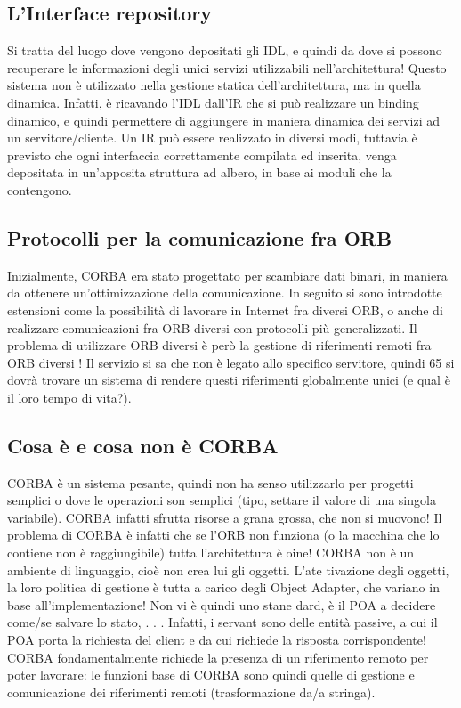 \subsection{L'Interface repository}
Si tratta del luogo dove vengono depositati gli IDL, e quindi da dove si possono
recuperare le informazioni degli unici servizi utilizzabili nell'architettura!
Questo sistema non è utilizzato nella gestione statica dell'architettura, ma
in quella dinamica. Infatti, è ricavando l'IDL dall'IR che si può realizzare un
binding dinamico, e quindi permettere di aggiungere in maniera dinamica dei
servizi ad un servitore/cliente.
Un IR può essere realizzato in diversi modi, tuttavia è previsto che ogni
interfaccia correttamente compilata ed inserita, venga depositata in un'apposita
struttura ad albero, in base ai moduli che la contengono.
\subsection{Protocolli per la comunicazione fra ORB}
Inizialmente, CORBA era stato progettato per scambiare dati binari, in maniera
da ottenere un'ottimizzazione della comunicazione. In seguito si sono introdotte
estensioni come la possibilità di lavorare in Internet fra diversi ORB, o anche di
realizzare comunicazioni fra ORB diversi con protocolli più generalizzati.
Il problema di utilizzare ORB diversi è però la gestione di riferimenti remoti
fra ORB diversi ! Il servizio si sa che non è legato allo specifico servitore, quindi
65
si dovrà trovare un sistema di rendere questi riferimenti globalmente unici (e
qual è il loro tempo di vita?).
\subsection{Cosa è e cosa non è CORBA}
CORBA è un sistema pesante, quindi non ha senso utilizzarlo per progetti
semplici o dove le operazioni son semplici (tipo, settare il valore di una singola
variabile). CORBA infatti sfrutta risorse a grana grossa, che non si muovono!
Il problema di CORBA è infatti che se l'ORB non funziona (o la macchina che
lo contiene non è raggiungibile) tutta l'architettura è oine!
CORBA non è un ambiente di linguaggio, cioè non crea lui gli oggetti. L'ate
tivazione degli oggetti, la loro politica di gestione è tutta a carico degli Object
Adapter, che variano in base all'implementazione! Non vi è quindi uno stane
dard, è il POA a decidere come/se salvare lo stato, . . . Infatti, i servant sono
delle entità passive, a cui il POA porta la richiesta del client e da cui richiede
la risposta corrispondente!
CORBA fondamentalmente richiede la presenza di un riferimento remoto
per poter lavorare: le funzioni base di CORBA sono quindi quelle di gestione e
comunicazione dei riferimenti remoti (trasformazione da/a stringa).
